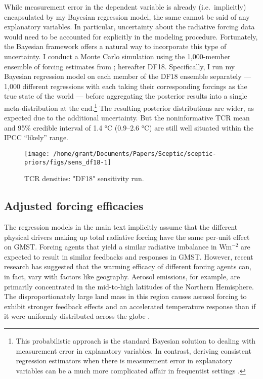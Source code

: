 \documentclass[
]{article}
\begin{document}
While measurement error in the dependent variable is already
(i.e.~implicitly) encapsulated by my Bayesian regression model, the same
cannot be said of any explanatory variables. In particular, uncertainty
about the radiative forcing data would need to be accounted for
explicitly in the modeling procedure. Fortunately, the Bayesian
framework offers a natural way to incorporate this type of uncertainty.
I conduct a Monte Carlo simulation using the 1,000-member ensemble of
forcing estimates from \cite{dessler2018ecs}; hereafter DF18.
Specifically, I run my Bayesian regression model on each member of the
DF18 ensemble separately --- 1,000 different regressions with each
taking their corresponding forcings as the true state of the world ---
before aggregating the posterior results into a single meta-distribution
at the end.\footnote{This probabilistic approach is the standard
  Bayesian solution to dealing with measurement error in explanatory
  variables. In contrast, deriving consistent regression estimators when
  there is measurement error in explanatory variables can be a much more
  complicated affair in frequentist settings
  \citep{greene2007econometric}.} The resulting posterior distributions
are wider, as expected due to the additional uncertainty. But the
noninformative TCR mean and 95\% credible interval of 1.4 °C (0.9--2.6
°C) are still well situated within the IPCC ``likely'' range.

\begin{figure}[H]

{\centering \texttt{[image: /home/grant/Documents/Papers/Sceptic/sceptic-priors/figs/sens\_df18-1]} 

}

\caption{TCR densities: "DF18" sensitivity run.}\label{fig:sens_df18}
\end{figure}

\newpage
\pagebreak

\hypertarget{adjusted-forcing-efficacies}{%
\subsection{Adjusted forcing
efficacies}\label{adjusted-forcing-efficacies}}

The regression models in the main text implicitly assume that the
different physical drivers making up total radiative forcing have the
same per-unit effect on GMST. Forcing agents that yield a similar
radiative imbalance in Wm\(^{-2}\) are expected to result in similar
feedbacks and responses in GMST. However, recent research has suggested
that the warming efficacy of different forcing agents can, in fact, vary
with factors like geography. Aerosol emissions, for example, are
primarily concentrated in the mid-to-high latitudes of the Northern
Hemisphere. The disproportionately large land mass in this region causes
aerosol forcing to exhibit stronger feedback effects and an accelerated
temperature response than if it were uniformly distributed across the
globe \cite{shindell2014tcr}.
\end{document}
